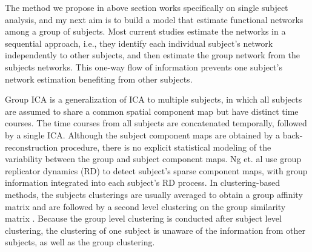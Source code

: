 \documentclass[12pt]{article}
\begin{document}
The method we propose in above section \cite{liu2011monteCopy} works specifically on
single subject analysis, and my next aim is to build a model that estimate
functional networks among a group of subjects.  Most current studies estimate
the networks in a sequential approach, i.e., they identify each individual
subject's network independently to other subjects, and then estimate the group
network from the subjects networks. This one-way flow of information prevents
one subject's network estimation benefiting from other subjects.

Group ICA \cite{calhoun2001spatial} is a generalization of ICA to multiple
subjects, in which all subjects are assumed to share a common spatial component
map but have distinct time courses. The time courses from all subjects are
concatenated temporally, followed by a single ICA. Although the subject
component maps are obtained by a back-reconstruction procedure, there is no
explicit statistical modeling of the variability between the group and subject
component maps.  Ng et. al \cite{nggroup2012} use group replicator dynamics (RD)
to detect subject's sparse component maps, with group information integrated
into each subject's RD process. In clustering-based methods, the subjects
clusterings are usually averaged to obtain a group affinity matrix and are
followed by a second level clustering on the group similarity matrix
\cite{bellec2010multi,van2008normalized}. Because the group level clustering is
conducted after subject level clustering, the clustering of one subject is
unaware of the information from other subjects, as well as the group clustering.
\end{document}
